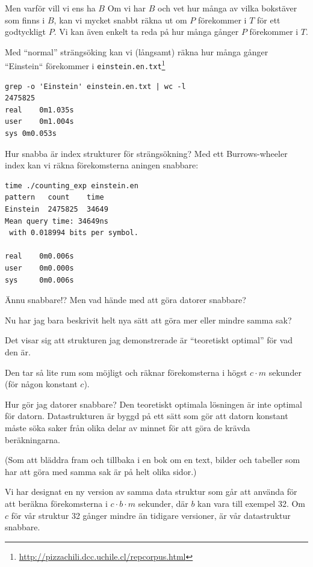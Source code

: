 \documentclass[11pt, aspectratio=169, table]{beamer}
\begin{document}
\begin{frame}[fragile]{Men varför vill vi ens ha $B$}
\setlength{\parskip}{\fill}
Om vi har $B$ och vet hur många av vilka bokstäver som finns i $B$, kan vi mycket snabbt räkna ut om $P$ 
förekommer i $T$ för ett godtyckligt $P$. Vi kan även enkelt ta reda på hur många gånger $P$ förekommer i $T$.

Med ``normal'' strängsöking kan vi (långsamt) räkna hur många gånger ``Einstein`` förekommer 
i \texttt{einstein.en.txt}\footnote{\url{http://pizzachili.dcc.uchile.cl/repcorpus.html}} 

\begin{verbatim}
grep -o 'Einstein' einstein.en.txt | wc -l
2475825
real	0m1.035s
user	0m1.004s
sys	0m0.053s
\end{verbatim}
\end{frame}

\begin{frame}[fragile]{Hur snabba är index strukturer för strängsökning?}
Med ett \alert{Burrows-wheeler} index kan vi räkna förekomsterna aningen snabbare:

\begin{verbatim}
time ./counting_exp einstein.en
pattern   count    time
Einstein  2475825  34649
Mean query time: 34649ns
 with 0.018994 bits per symbol.

real    0m0.006s
user    0m0.000s
sys     0m0.006s
\end{verbatim}
\end{frame}

\begin{frame}{Ännu snabbare!?}
\setlength{\parskip}{\fill}
Men vad hände med att göra datorer snabbare?

Nu har jag bara beskrivit helt nya sätt att göra mer eller mindre samma sak?

Det visar sig att strukturen jag demonstrerade  är ``teoretiskt optimal'' för vad den är.

Den tar så lite rum som möjligt och räknar förekomsterna i högst $c\cdot m$ sekunder (för någon konstant $c$).
\end{frame}

\begin{frame}{Hur gör jag datorer snabbare?}
\setlength{\parskip}{\fill}
Den teoretiskt optimala lösningen är inte optimal för datorn. 
Datastrukturen är byggd på ett sätt som gör att datorn konstant måste söka saker från olika delar av 
minnet för att göra de krävda beräkningarna.

(Som att bläddra fram och tillbaka i en bok om en text, bilder och tabeller som har att göra med samma sak är på helt olika sidor.)

Vi har designat en ny version av samma data struktur som går att använda för att beräkna förekomsterna i $c\cdot b \cdot m$ sekunder, 
där $b$ kan vara till exempel 32. Om $c$ för vår struktur 32 gånger mindre än tidigare versioner, är vår datastruktur snabbare.
\end{frame}
\end{document}
